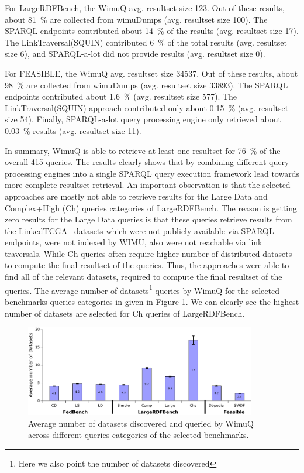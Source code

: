 \documentclass[sw]{iosart2x}
\begin{document}
For LargeRDFBench, the WimuQ avg. resultset size 123. Out of these results, about \SI{81}{\percent} are collected from wimuDumps (avg. resultset size 100). The SPARQL endpoints contributed about \SI{14}{\percent} of the results (avg. resultset size 17). The LinkTraversal(SQUIN) contributed \SI{6}{\percent} of the total results (avg. resultset size 6), and SPARQL-a-lot did not provide results (avg. resultset size 0). 

For FEASIBLE, the WimuQ avg. resultset size \num{34537}. Out of these results, about \SI{98}{\percent} are collected from wimuDumps (avg. resultset size \num{33893}). The SPARQL endpoints contributed about \SI{1.6}{\percent} (avg. resultset size 577). The LinkTraversal(SQUIN) approach contributed only about \SI{0.15}{\percent} (avg. resultset size 54). Finally, SPARQL-a-lot query processing engine only retrieved about \SI{0.03}{\percent} results (avg. resultset size 11). 

In summary, WimuQ is able to retrieve at least one resultset for \SI{76}{\percent} of the overall 415 queries. The results clearly shows that by combining different query processing engines into a single SPARQL query execution framework lead towards more complete resultset retrieval. 
An important observation is that the selected approaches are mostly not able to retrieve results for the Large Data and Complex+High (Ch) queries categories of LargeRDFBench. The reason is getting zero results for the Large Data queries is that these queries retrieve results from the LinkedTCGA~\cite{tcga2013} datasets which were not publicly available via SPARQL endpoints, were not indexed by WIMU, also were not reachable via link traversals. While Ch queries often require higher number of distributed datasets to compute the final resultset of the queries. Thus, the approaches were able to find all of the relevant datasets, required to compute the final resultset of the queries. The average number of datasets\footnote{Here we also point the number of datasets discovered} queries by WimuQ for the selected benchmarks queries categories in given in Figure \ref{fig:numberDatasets1}. We can clearly see the highest number of datasets are selected for Ch queries of LargeRDFBench. 

\begin{figure}[htb]
\centering
    \includegraphics[width=0.9\textwidth]{img/numberDatasets1.pdf}
	\caption{Average number of datasets discovered and queried by WimuQ across different queries categories of the selected benchmarks.}
	\label{fig:numberDatasets1}
\end{figure}
\end{document}

